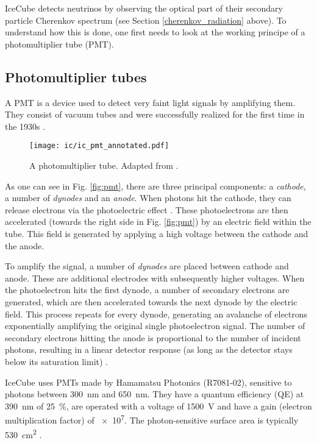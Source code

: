 IceCube detects neutrinos by observing the optical part of their secondary particle Cherenkov spectrum (see Section \ref{cherenkov_radiation} above). To understand how this is done, one first needs to look at the working principe of a photomultiplier tube (PMT).

\subsection{Photomultiplier tubes}
A PMT is a device used to detect very faint light signals by amplifying them. They consist of vacuum tubes and were successfully realized for the first time in the 1930s .

\begin{figure}[h!]
    \texttt{[image: ic/ic\_pmt\_annotated.pdf]}
    \caption[PMT schematic]{A photomultiplier tube. Adapted from \cite{Bednarski2014}.}
\end{figure}

As one can see in Fig. \ref{fig:pmt}, there are three principal components: a \textit{cathode}, a number of \textit{dynodes} and an \textit{anode}. When photons hit the cathode, they can release electrons via the photoelectric effect . These photoelectrons are then accelerated (towards the right side in Fig. \ref{fig:pmt}) by an electric field within the tube. This field is generated by applying a high voltage between the cathode and the anode.

To amplify the signal, a number of \textit{dynodes} are placed between cathode and anode. These are additional electrodes with subsequently higher voltages. When the photoelectron hits the first dynode, a number of secondary electrons are generated, which are then accelerated towards the next dynode by the electric field. This process repeats for every dynode, generating an avalanche of electrons exponentially amplifying the original single photoelectron signal. The number of secondary electrons hitting the anode is proportional to the number of incident photons, resulting in a linear detector response (as long as the detector stays below its saturation limit) .

IceCube uses PMTs made by Hamamatsu Photonics (R7081-02), sensitive to photons between \SI{300}{\nm} and \SI{650}{\nm}. They have a quantum efficiency (QE) at \SI{390}{\nm} of \SI{25}{\percent}, are operated with a voltage of \SI{1500}{\V} and have a gain (electron multiplication factor) of \num{e7}. The photon-sensitive surface area is typically \SI{530}{\cm\squared} .

